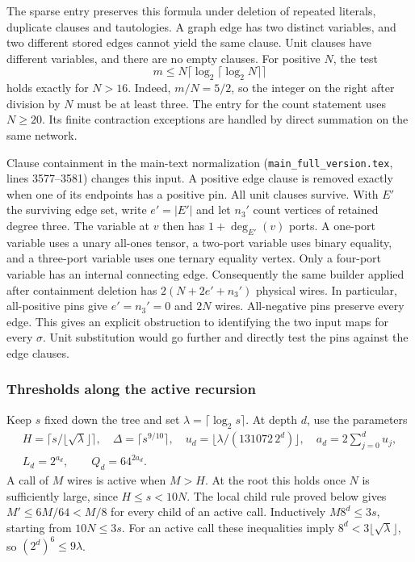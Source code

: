 \documentclass[
  11pt,
]{article}
\newcommand{\floor}[1]{\lfloor #1\rfloor}
\newcommand{\ceil}[1]{\lceil #1\rceil}
\begin{document}
The sparse entry preserves this formula under deletion of repeated
literals, duplicate clauses and tautologies. A graph edge has two
distinct variables, and two different stored edges cannot yield the
same clause. Unit clauses have different variables, and there are no
empty clauses. For positive \(N\), the test
\[
                m\le N\ceil{\log_2\ceil{\log_2 N}}
\]
holds exactly for \(N>16\). Indeed, \(m/N=5/2\), so the integer on the
right after division by \(N\) must be at least three. The entry for the
count statement uses \(N\ge20\). Its finite contraction exceptions are
handled by direct summation on the same network.

Clause containment in the main-text normalization
(\texttt{main\_full\_version.tex}, lines 3577--3581) changes this input.
A positive edge clause is removed exactly when one of its endpoints
has a positive pin. All unit clauses survive. With \(E'\) the surviving
edge set, write \(e'=|E'|\) and let \(n_3'\) count vertices of retained
degree three. The variable at \(v\) then has \(1+\deg_{E'}(v)\) ports.
A one-port variable uses a unary all-ones tensor, a two-port variable
uses binary equality, and a three-port variable uses one ternary
equality vertex. Only a four-port variable has an internal connecting
edge. Consequently the same builder applied after containment
deletion has \(2(N+2e'+n_3')\) physical wires. In particular,
all-positive pins give \(e'=n_3'=0\) and \(2N\) wires. All-negative pins
preserve every edge. This gives an explicit obstruction to identifying
the two input maps for every \(\sigma\). Unit substitution would go
further and directly test the pins against the edge clauses.

\subsubsection*{Thresholds along the active recursion}

Keep \(s\) fixed down the tree and set \(\lambda=\ceil{\log_2 s}\).
At depth \(d\), use the parameters
\[
\begin{gathered}
 H=\ceil{s/\floor{\sqrt{\lambda}}},\quad
 \Delta=\ceil{s^{9/10}},\quad
 u_d=\floor{\lambda/(131072\,2^d)},\quad
 a_d=2\sum_{j=0}^d u_j,\\
 L_d=2^{a_d},\qquad Q_d=64^{2a_d}.
\end{gathered}
\]
A call of \(M\) wires is active when \(M>H\). At the root this holds
once \(N\) is sufficiently large, since \(H\le s<10N\). The local
child rule proved below gives \(M'\le 6M/64<M/8\) for every child of an
active call. Inductively \(M8^d\le3s\), starting from \(10N\le3s\).
For an active call these inequalities imply
\(8^d<3\floor{\sqrt{\lambda}}\), so \((2^d)^6\le9\lambda\).
\end{document}
